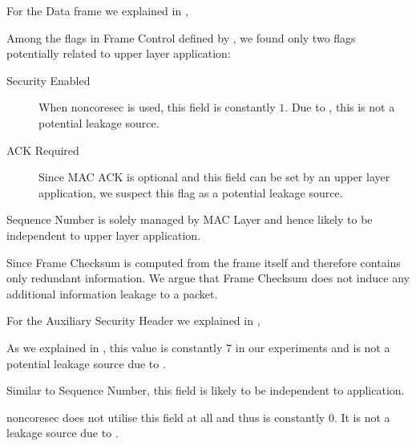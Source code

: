 For the Data frame we explained in ,
\begin{description}[style=nextline]
	\item[Frame Control]
	Among the flags in Frame Control defined by \cite{802154}, we found only two flags potentially related to upper layer application:
		\begin{description}
			\item[Security Enabled]
			When noncoresec is used, this field is constantly $1$. Due to , this is not a potential leakage source.
			\item[ACK Required]
			Since MAC ACK is optional and this field can be set by an upper layer application, we suspect this flag as a potential leakage source.
		\end{description}
	\item[Sequence Number]
	Sequence Number is solely managed by MAC Layer and hence likely to be independent to upper layer application.
	\item[Frame Checksum]
	Since Frame Checksum is computed from the frame itself and therefore contains only redundant information. We argue that Frame Checksum does not induce any additional information leakage to a packet.
\end{description}

For the Auxiliary Security Header we explained in ,

\begin{description}[style=nextline]
	\item[Security Level]
	As we explained in , this value is constantly $7$ in our experiments and is not a potential leakage source due to .
	\item[Frame Counter]
	Similar to Sequence Number, this field is likely to be independent to application.
	\item[Key Strategy]
	noncoresec does not utilise this field at all and thus is constantly $0$. It is not a leakage source due to .
\end{description}

